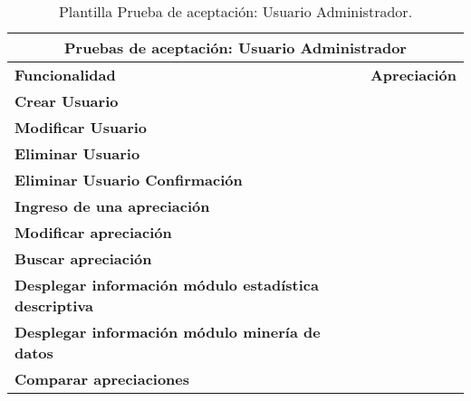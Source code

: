 \begin{table}[h!]
	\centering
	\begin{tabular}{|l|l|}
		\hline
		\multicolumn{2}{|c|}{\textbf{Pruebas de aceptación: Usuario Administrador}}           \\ \hline
		\textbf{Funcionalidad}                                        & \textbf{Apreciación}  \\ \hline
		\textbf{Crear Usuario}                                        & \multicolumn{1}{c|}{} \\ \hline
		\textbf{Modificar Usuario}                                    &                       \\ \hline
		\textbf{Eliminar Usuario}                                     &                       \\ \hline
		\textbf{Eliminar Usuario Confirmación}                        &                       \\ \hline
		\textbf{Ingreso de una apreciación}                           &                       \\ \hline
		\textbf{Modificar apreciación}                                &                       \\ \hline
		\textbf{Buscar apreciación}                                   &                       \\ \hline
		\textbf{Desplegar información módulo estadística descriptiva} &                       \\ \hline
		\textbf{Desplegar información módulo minería de datos}        &                       \\ \hline
		\textbf{Comparar apreciaciones}                               &                       \\ \hline	
	\end{tabular}
	\caption{Plantilla Prueba de aceptación: Usuario Administrador.}
\end{table}
\clearpage
\newpage

